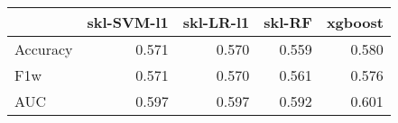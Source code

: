 \begin{tabular}{lrrrr}
\toprule
{} &  skl-SVM-l1 &  skl-LR-l1 &  skl-RF &  xgboost \\
\midrule
Accuracy &       0.571 &      0.570 &   0.559 &    0.580 \\
F1w      &       0.571 &      0.570 &   0.561 &    0.576 \\
AUC      &       0.597 &      0.597 &   0.592 &    0.601 \\
\bottomrule
\end{tabular}
